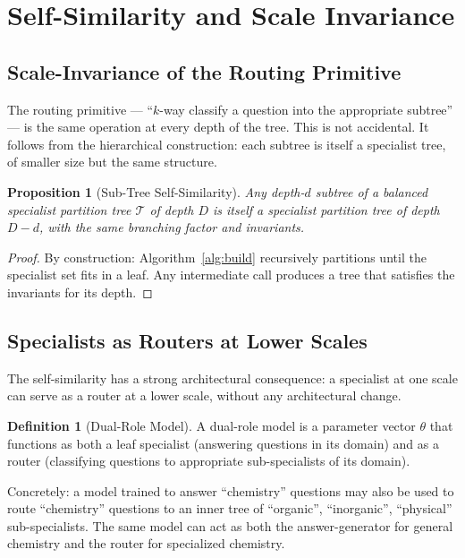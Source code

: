 \documentclass[11pt,a4paper]{article}
\newtheorem{proposition}[theorem]{Proposition}
\theoremstyle{definition}
\newtheorem{definition}[theorem]{Definition}
\theoremstyle{remark}
\newcommand{\Tc}{\mathcal{T}}
\begin{document}
\section{Self-Similarity and Scale Invariance}
\label{sec:self-similar}

\subsection{Scale-Invariance of the Routing Primitive}

The routing primitive --- ``$k$-way classify a question into the appropriate subtree'' --- is the same operation at every depth of the tree. This is not accidental. It follows from the hierarchical construction: each subtree is itself a specialist tree, of smaller size but the same structure.

\begin{proposition}[Sub-Tree Self-Similarity]
\label{prop:selfsim}
Any depth-$d$ subtree of a balanced specialist partition tree $\Tc$ of depth $D$ is itself a specialist partition tree of depth $D - d$, with the same branching factor and invariants.
\end{proposition}

\begin{proof}
By construction: Algorithm~\ref{alg:build} recursively partitions until the specialist set fits in a leaf. Any intermediate call produces a tree that satisfies the invariants for its depth.
\end{proof}

\subsection{Specialists as Routers at Lower Scales}

The self-similarity has a strong architectural consequence: a specialist at one scale can serve as a router at a lower scale, without any architectural change.

\begin{definition}[Dual-Role Model]
A dual-role model is a parameter vector $\theta$ that functions as both a leaf specialist (answering questions in its domain) and as a router (classifying questions to appropriate sub-specialists of its domain).
\end{definition}

Concretely: a model trained to answer ``chemistry'' questions may also be used to route ``chemistry'' questions to an inner tree of ``organic'', ``inorganic'', ``physical'' sub-specialists. The same model can act as both the answer-generator for general chemistry and the router for specialized chemistry.
\end{document}
